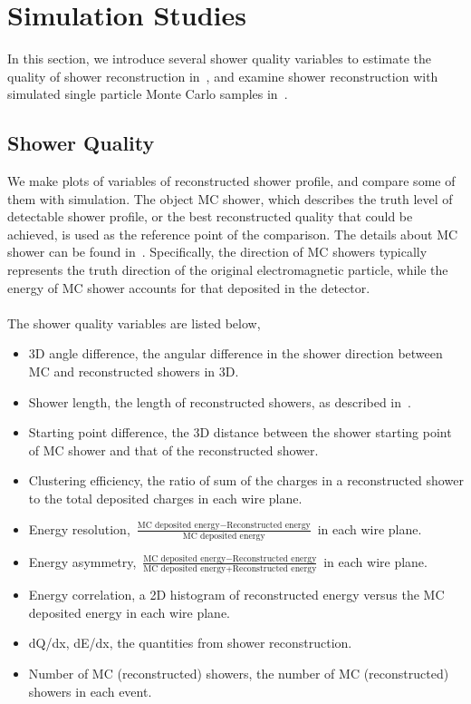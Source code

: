 \section{Simulation Studies}
\label{sec:mc}

In this section, we introduce several shower quality variables to estimate
the quality of shower reconstruction in~, and examine
shower reconstruction with simulated single particle Monte Carlo samples
in~.

\subsection{Shower Quality}
\label{sec:shr_quality}

We make plots of variables of reconstructed shower profile, and compare
some of them with simulation.
The object MC shower, which describes the truth level of detectable shower
profile, or the best reconstructed quality that could be achieved, 
is used as the reference point of the comparison.
The details about MC shower can be found in~\cite{DocDB3771}.
Specifically, the direction of MC showers typically represents the truth 
direction of the original electromagnetic particle, while the energy of
MC shower accounts for that deposited in the detector.\\
\\
The shower quality variables are listed below,
\begin{itemize}
\item 3D angle difference, the angular difference in the shower direction 
      between
      MC and reconstructed showers in 3D.
\item Shower length, the length of reconstructed showers, as described
      in~.
\item Starting point difference, the 3D distance between the shower
      starting point of MC shower and that of the reconstructed shower.
\item Clustering efficiency, the ratio of sum of the charges
      in a reconstructed shower to the total deposited charges in
      each wire plane.
\item Energy resolution, $\frac{\textrm{MC deposited energy}-\textrm{Reconstructed energy}}{\textrm{MC deposited energy}}$ in each wire plane.
\item Energy asymmetry, $\frac{\textrm{MC deposited energy}-\textrm{Reconstructed energy}}{\textrm{MC deposited energy}+\textrm{Reconstructed energy}}$ in each wire plane.
\item Energy correlation, a 2D histogram of reconstructed energy versus 
      the MC deposited energy in each wire plane.
\item dQ/dx, dE/dx, the quantities from shower reconstruction.
\item Number of MC (reconstructed) showers, the number of MC (reconstructed)
      showers in each event.
\end{itemize}

